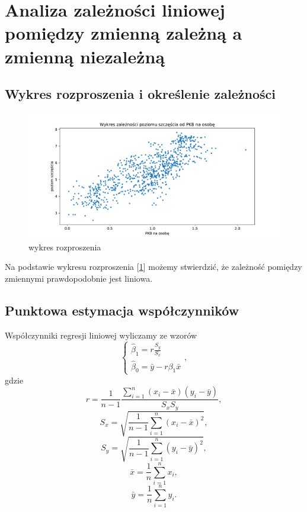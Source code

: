 \documentclass{article}
\theoremstyle{break}
\begin{document}
\section{Analiza zależności liniowej pomiędzy zmienną zależną a zmienną niezależną}

\subsection{Wykres rozproszenia i określenie zależności}

\begin{figure}[H]
	\begin{center}
		\includegraphics[scale=0.43]{plot1.pdf}
		\caption{wykres rozproszenia}
		\label{fig:rozproszenie}
	\end{center}
\end{figure}

Na podstawie wykresu rozproszenia [\ref{fig:rozproszenie}] możemy stwierdzić, że zależność pomiędzy zmiennymi prawdopodobnie jest liniowa.

\subsection{Punktowa estymacja współczynników}

Współczynniki regresji liniowej wyliczamy ze wzorów
\begin{equation}
\left\{ \begin{array}{ll}
	\hat{\beta}_{1} = r\frac{S_{y}}{S_{x}}\\
	\hat{\beta}_{0} = \bar{y} - r\beta_{1}\bar{x}
\end{array} \right.,
\label{eq:wspol_reg}
\end{equation} gdzie
\begin{equation}
	r = \frac{1}{n-1}\frac{\sum_{i=1}^{n}(x_i-\bar{x})(y_i-\bar{y})}{S_{x}S_{y}},
\end{equation}
\begin{equation}
	S_{x} = \sqrt{\frac{1}{n-1}\sum_{i=1}^{n}(x_{i}-\bar{x})^{2}},
\end{equation}
\begin{equation}
	S_{y} = \sqrt{\frac{1}{n-1}\sum_{i=1}^{n}(y_{i}-\bar{y})^{2}},
\end{equation}
\begin{equation}
	\bar{x} = \frac{1}{n}\sum_{i=1}^{n}x_{i},
\end{equation}
\begin{equation}
	\bar{y} = \frac{1}{n}\sum_{i=1}^{n}y_{i}.
\end{equation}
\end{document}
